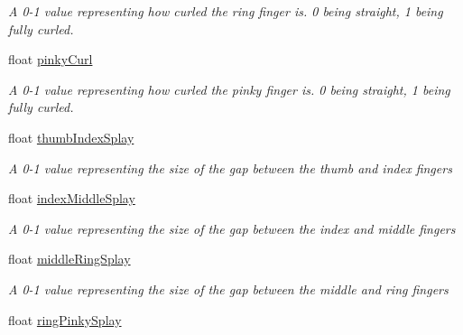 \begin{DoxyCompactItemize}
\begin{DoxyCompactList}\small\item\em A 0-\/1 value representing how curled the ring finger is. 0 being straight, 1 being fully curled. \end{DoxyCompactList}\item 
float \mbox{\hyperlink{class_valve_1_1_v_r_1_1_steam_v_r___action___skeleton_a3702b47217fb09774c2404a76194cefe}{pinky\+Curl}}
\begin{DoxyCompactList}\small\item\em A 0-\/1 value representing how curled the pinky finger is. 0 being straight, 1 being fully curled. \end{DoxyCompactList}\item 
float \mbox{\hyperlink{class_valve_1_1_v_r_1_1_steam_v_r___action___skeleton_ab7d9b74f2d800ad8cc29e326f01b3b2d}{thumb\+Index\+Splay}}
\begin{DoxyCompactList}\small\item\em A 0-\/1 value representing the size of the gap between the thumb and index fingers \end{DoxyCompactList}\item 
float \mbox{\hyperlink{class_valve_1_1_v_r_1_1_steam_v_r___action___skeleton_a5fa7a1cda4ef19c596a08702ea2a0171}{index\+Middle\+Splay}}
\begin{DoxyCompactList}\small\item\em A 0-\/1 value representing the size of the gap between the index and middle fingers \end{DoxyCompactList}\item 
float \mbox{\hyperlink{class_valve_1_1_v_r_1_1_steam_v_r___action___skeleton_a3967215eab1247d25c8fda79b678ab43}{middle\+Ring\+Splay}}
\begin{DoxyCompactList}\small\item\em A 0-\/1 value representing the size of the gap between the middle and ring fingers \end{DoxyCompactList}\item 
float \mbox{\hyperlink{class_valve_1_1_v_r_1_1_steam_v_r___action___skeleton_a467d52a2f9712d65918f79950f68d3be}{ring\+Pinky\+Splay}}

\end{DoxyCompactItemize}
